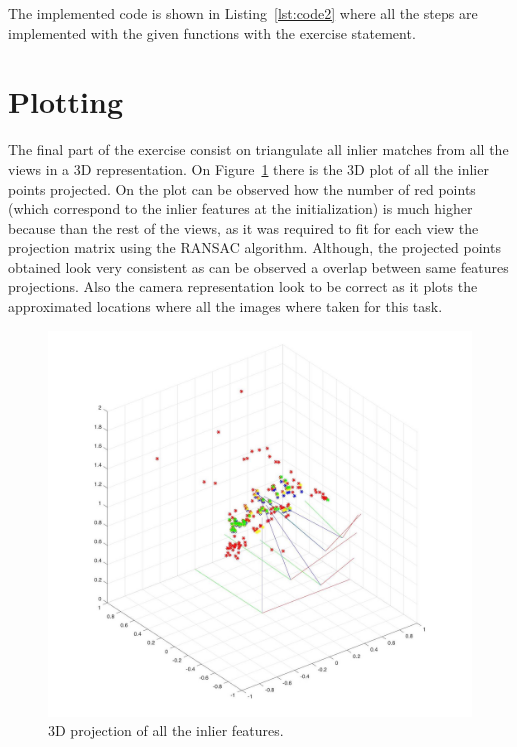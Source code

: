 \documentclass{ethz_report}
\begin{document}
The implemented code is shown in Listing~\ref{lst:code2} where all the steps are implemented with the given functions with the exercise statement.



\section*{Plotting}

The final part of the exercise consist on triangulate all inlier matches from all the views in a 3D representation. On Figure~\ref{fig:3d_projection} there is the 3D plot of all the inlier points projected. On the plot can be observed how the number of red points (which correspond to the inlier features at the initialization) is much higher because than the rest of the views, as it was required to fit for each view the projection matrix using the RANSAC algorithm. Although, the projected points obtained look very consistent as can be observed a overlap between same features projections. Also the camera representation look to be correct as it plots the approximated locations where all the images where taken for this task.

\begin{figure}[h]
    \centering
    \includegraphics[width=1\linewidth]{images/points3d_projection}
    \caption{3D projection of all the inlier features.}
    \label{fig:3d_projection}
\end{figure}
\end{document}
